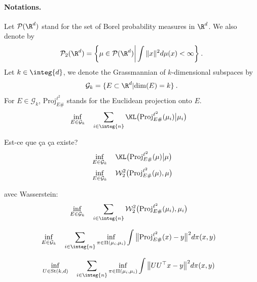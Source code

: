 \paragraph{Notations.}
Let $\mathcal{P}(\R^d)$ stand for the set of Borel probability measures in $\R^d$. We also denote by 
\begin{align*}
\mathcal{P}_2(\R^d) = \bigg\{\mu \in \mathcal{P}(\R^d) \bigg| \int \| x \|^2 d\mu(x) < \infty \bigg\} \:.
\end{align*}
Let $k \in \integ{d}$, we denote the Grassmannian of
$k$-dimensional subspaces by
\begin{align*}
  \mathcal{G}_k = \{E \subset \R^d | \mathrm{dim}(E) = k \} \:.
\end{align*}
For $E \in \mathcal{G}_k$, $\mathrm{Proj}^{\ell^2}_{E \#}$ stands for the Euclidean projection onto $E$.
\begin{align*}
  &\inf_{E \in \mathcal{G}_k} \quad \sum_{i \in \integ{n}} \KL \big(\mathrm{Proj}^{\ell^2}_{E \#} (\mu_i) \big| \mu_i \big)
\end{align*}

Est-ce que ça ça existe? 
\begin{align*}
  &\inf_{E \in \mathcal{G}_k} \quad \KL \big(\mathrm{Proj}^{\ell^2}_{E \#} (\mu) \big| \mu \big) \\
  &\inf_{E \in \mathcal{G}_k} \quad \mathcal{W}_2^2 \big(\mathrm{Proj}^{\ell^2}_{E \#} (\mu), \mu \big)
\end{align*}

avec Wasserstein:
\begin{align*}
  &\inf_{E \in \mathcal{G}_k} \quad \sum_{i \in \integ{n}} \mathcal{W}_2^2 \big(\mathrm{Proj}^{\ell^2}_{E \#} (\mu_i), \mu_i \big)
\end{align*}

\begin{align*}
  &\inf_{E \in \mathcal{G}_k} \quad \sum_{i \in \integ{n}} \inf_{\pi \in \Pi(\mu_i, \mu_i)} \int \big\|\mathrm{Proj}^{\ell^2}_{E \#}(x) - y \big\|^2 d\pi(x,y)
\end{align*}

\begin{align*}
  &\inf_{U \in \mathrm{St}(k,d)} \quad \sum_{i \in \integ{n}} \inf_{\pi \in \Pi(\mu_i, \mu_i)} \int \big\| UU^{\top} x - y \big\|^2 d\pi(x,y)
\end{align*}